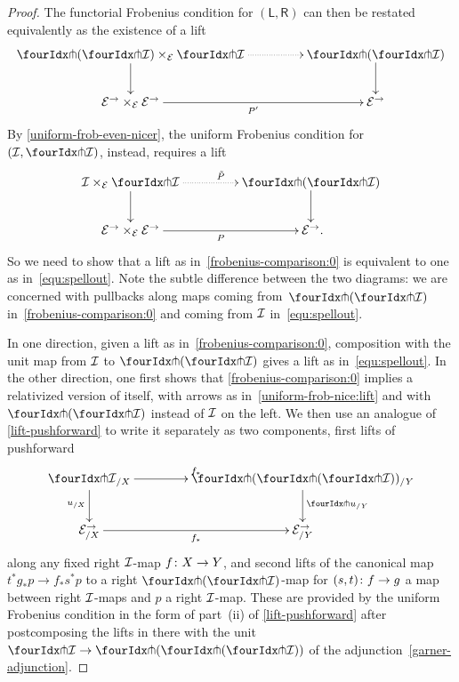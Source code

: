 \documentclass[reqno,10pt,a4paper,oneside,draft]{amsart}
\newcommand{\LL}{\mathsf{L}}
\newcommand{\RR}{\mathsf{R}}
\begin{document}
{{\begin{proof}
The functorial Frobenius condition for $(\LL, \RR)$ can then be restated equivalently as the existence of a lift
\begin{equation} 
\label{frobenius-comparison:0}
\begin{gathered}
\xymatrix@C+2em{
  \liftl{(\liftr{\cal{I}})} \times_{\cal{E}} \liftr{\cal{I}}
  \ar@{.>}[r]
  \ar[d]
&
  \liftl{(\liftr{\cal{I}})}
  \ar[d]
\\
  \cal{E}^\to \times_{\cal{E}} \cal{E}^\to
  \ar[r]_{P'}
&
  \cal{E}^\to
}
\end{gathered}
\end{equation}
By  \cref{uniform-frob-even-nicer}, the uniform Frobenius condition for $(\cal{I}, \liftr{\cal{I}})$, instead, requires a lift 
\begin{equation}
\label{equ:spellout}
\begin{gathered}
\xymatrix@C+2em{
  \cal{I} \times_{\cal{E}} \liftr{\cal{I}}
  \ar@{.>}[r]^{\tilde{P}}
  \ar[d] 
&
  \liftl{(\liftr{\cal{I}})}
  \ar[d]
\\
  \cal{E}^\to \times_{\cal{E}} \cal{E}^\to
  \ar[r]_{P}
&
  \cal{E}^\to
\rlap{.}}
\end{gathered}
\end{equation}
So we need to show that a lift as in~\eqref{frobenius-comparison:0} is equivalent to  one as in~\eqref{equ:spellout}. Note the subtle difference between the two diagrams:  we are concerned with pullbacks along maps coming from~$\liftl{(\liftr{\cal{I}})}$ in~\eqref{frobenius-comparison:0} and coming from $\cal{I}$ in~\eqref{equ:spellout}. 


In one direction, given a lift as in~\eqref{frobenius-comparison:0}, composition with the unit map from $\cal{I}$ to $\liftl{(\liftr{\cal{I}})}$ gives
a lift as in~\eqref{equ:spellout}. In the other direction, one first shows that \eqref{frobenius-comparison:0} implies a relativized version of itself, with arrows as in~\eqref{uniform-frob-nice:lift} and with $\liftl{(\liftr{\cal{I}})}$ instead of $\cal{I}$ on the left. We then use an analogue of \cref{lift-pushforward} to write it separately as two components, first lifts of pushforward
\[
\xymatrix@C=1.5cm{
  {\liftr{\cal{I}}}_{/X}
  \ar[r]^{f_*}
  \ar[d]_{u_{/X}}
&
  \liftr{(\liftl{({\liftr{\cal{I}}})})}_{/Y}
  \ar[d]^{{\liftr{u}}_{/Y}}
\\
  \catE_{/X}^\to
  \ar[r]_{f_*}
&
  \catE_{/Y}^\to
}
\]
along any fixed right $\cal{I}$-map $f \co X \to Y$, and second lifts of the canonical map $t^* g_* p \to f_* s^* p$ to a right $\liftl{(\liftr{\cal{I}})}$-map for $(s, t) \co f \to g$ a map between right $\cal{I}$-maps and $p$ a right $\cal{I}$-map.
These are provided by the uniform Frobenius condition in the form of part~(ii) of \cref{lift-pushforward} after postcomposing the lifts in there with the unit  $\liftr{\cal{I}} \to \liftr{(\liftl{(\liftr{\cal{I}})})}$ of the adjunction~\eqref{garner-adjunction}.
\end{proof}

}}
\end{document}

